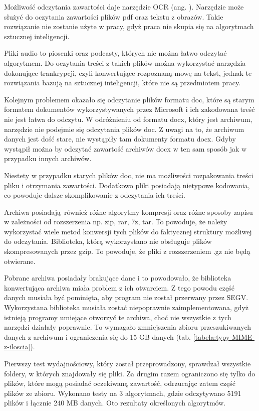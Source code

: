 Możliwość odczytania zawartości daje narzędzie OCR (ang. ).
Narzędzie może służyć do oczytania zawartości plików pdf oraz tekstu z obrazów.
Takie rozwiązanie nie zostanie użyte w pracy, gdyż praca nie skupia się na 
algorytmach sztucznej inteligencji.

Pliki audio to piosenki oraz podcasty, których nie można łatwo odczytać algorytmem.
Do oczytania treści z takich plików można wykorzystać narzędzia dokonujące 
trankrypcji, czyli konwertujące rozpoznaną mowę na tekst, jednak te rozwiązania bazują 
na sztucznej inteligencji, które nie są przedmiotem pracy.

Kolejnym problemem okazało się odczytanie plików formatu doc, które są starym 
formatem dokumentów wykorzystywanych przez Microsoft i ich zakodowana treść nie
jest łatwa do odczytu. W odróżnieniu od formatu docx, który jest archiwum, 
narzędzie nie podejmie się odczytania plików doc. Z uwagi na to, że archiwum danych
jest dość stare, nie wystąpiły tam dokumenty formatu docx. Gdyby wystąpił można
by odczytać zawartość archiwów docx w ten sam sposób jak w przypadku innych 
archiwów.

Niestety w przypadku starych plików doc, nie ma możliwości rozpakowania treści
pliku i otrzymania zawartości. Dodatkowo pliki posiadają nietypowe kodowania,
co powoduje dalsze skomplikowanie z odczytania ich treści.

Archiwa posiadają również różne algorytmy kompresji oraz różne sposoby zapisu \\ w zależności od
rozszerzenia np. zip, rar, 7z, tar. To powoduje, że należy wykorzystać wiele
metod konwersji tych plików do faktycznej struktury możliwej do odczytania. 
Biblioteka, którą wykorzystano nie obsługuje plików skompresowanych przez gzip.
To powoduje, że pliki z rozszerzeniem .gz nie będą otwierane.

Pobrane archiwa posiadały brakujące dane i to powodowało, że biblioteka konwertująca
archiwa miała problem z ich otwarciem. Z tego powodu część danych musiała być 
pominięta, aby program nie został przerwany przez SEGV. Wykorzystana biblioteka
musiała zostać niepoprawnie zaimplementowana, gdyż istnieją programy umiejące 
otworzyć te archiwa, choć nie wszystkie z tych narzędzi działały poprawnie.
To wymagało zmniejszenia zbioru przeszukiwanych danych z archiwum i ograniczenia
się do 15 GB danych (tab. \ref{tabela:typy-MIME-z-iloscia}).




Pierwszy test wydajnościowy, który został przeprowadzony, sprawdzał wszystkie 
foldery, w których znajdowały się pliki. Za drugim razem ograniczono się tylko
do plików, które mogą posiadać oczekiwaną zawartość, odrzucając zatem część 
plików ze zbioru. Wykonano testy na 3 algorytmach, gdzie odczytywano 5191 plików 
i łącznie 240 MB danych. Oto rezultaty określonych algorytmów.


